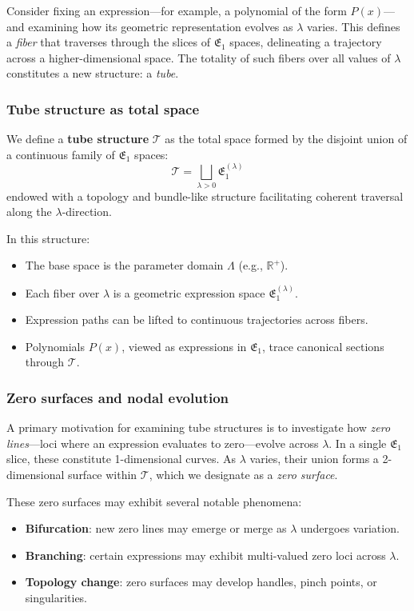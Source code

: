Consider fixing an expression—for example, a polynomial of the form $P(x)$—and examining how its geometric representation evolves as $\lambda$ varies. This defines a \emph{fiber} that traverses through the slices of $\mathfrak{E}_1$ spaces, delineating a trajectory across a higher-dimensional space. The totality of such fibers over all values of $\lambda$ constitutes a new structure: a \emph{tube}.

\subsubsection{Tube structure as total space}

We define a \textbf{tube structure} $\mathcal{T}$ as the total space formed by the disjoint union of a continuous family of $\mathfrak{E}_1$ spaces:
\begin{equation}
\mathcal{T} = \bigsqcup_{\lambda > 0} \mathfrak{E}_1^{(\lambda)}
\end{equation}
endowed with a topology and bundle-like structure facilitating coherent traversal along the $\lambda$-direction.

In this structure:
\begin{itemize}
\item The base space is the parameter domain $\Lambda$ (e.g., $\mathbb{R}^+$).
\item Each fiber over $\lambda$ is a geometric expression space $\mathfrak{E}_1^{(\lambda)}$.
\item Expression paths can be lifted to continuous trajectories across fibers.
\item Polynomials $P(x)$, viewed as expressions in $\mathfrak{E}_1$, trace canonical sections through $\mathcal{T}$.
\end{itemize}

\subsubsection{Zero surfaces and nodal evolution}

A primary motivation for examining tube structures is to investigate how \emph{zero lines}—loci where an expression evaluates to zero—evolve across $\lambda$. In a single $\mathfrak{E}_1$ slice, these constitute 1-dimensional curves. As $\lambda$ varies, their union forms a 2-dimensional surface within $\mathcal{T}$, which we designate as a \emph{zero surface}.

These zero surfaces may exhibit several notable phenomena:
\begin{itemize}
\item \textbf{Bifurcation}: new zero lines may emerge or merge as $\lambda$ undergoes variation.
\item \textbf{Branching}: certain expressions may exhibit multi-valued zero loci across $\lambda$.
\item \textbf{Topology change}: zero surfaces may develop handles, pinch points, or singularities.
\end{itemize}

